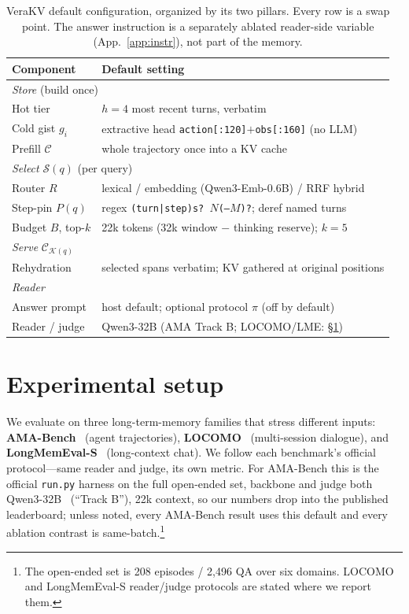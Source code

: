 \documentclass{article} %
\newcommand{\kvm}{VeraKV}
\begin{document}
\begin{table}[t]
\centering
\caption{\kvm{} default configuration, organized by its two pillars. Every row is
a swap point. The answer instruction is a separately ablated reader-side variable
(App.~\ref{app:instr}), not part of the memory.}
\label{tab:config}
\footnotesize
\begin{tabular}{ll}
\toprule
Component & Default setting \\
\midrule
\multicolumn{2}{l}{\emph{Store} (build once)} \\
\quad Hot tier & $h{=}4$ most recent turns, verbatim \\
\quad Cold gist $g_i$ & extractive head \texttt{action[:120]}$+$\texttt{obs[:160]} (no LLM) \\
\quad Prefill $\mathcal{C}$ & whole trajectory once into a KV cache \\
\midrule
\multicolumn{2}{l}{\emph{Select} $\mathcal{S}(q)$ (per query)} \\
\quad Router $R$ & lexical / embedding (Qwen3-Emb-0.6B) / RRF hybrid \\
\quad Step-pin $P(q)$ & regex \texttt{(turn|step)s?\,$N$(--$M$)?}; deref named turns \\
\quad Budget $B$, top-$k$ & 22k tokens (32k window $-$ thinking reserve); $k{=}5$ \\
\midrule
\multicolumn{2}{l}{\emph{Serve} $\mathcal{C}_{\mathcal{K}(q)}$} \\
\quad Rehydration & selected spans verbatim; KV gathered at original positions \\
\midrule
\multicolumn{2}{l}{\emph{Reader}} \\
\quad Answer prompt & host default; optional protocol $\pi$ (off by default) \\
\quad Reader / judge & Qwen3-32B (AMA Track B; LOCOMO/LME: \S\ref{sec:setup}) \\
\bottomrule
\end{tabular}
\end{table}

\section{Experimental setup}
\label{sec:setup}

We evaluate on three long-term-memory families that stress different inputs:
\textbf{AMA-Bench}~\citep{amabench} (agent trajectories), \textbf{LOCOMO}~\citep{locomo}
(multi-session dialogue), and \textbf{LongMemEval-S}~\citep{longmemeval} (long-context
chat). We follow each benchmark's official protocol---same reader and judge, its own
metric. For AMA-Bench this is the official \texttt{run.py} harness on the full
open-ended set, backbone and judge both Qwen3-32B~\citep{qwen3} (``Track B''), 22k
context, so our numbers drop into the published leaderboard; unless noted, every
AMA-Bench result uses this default and every ablation contrast is
same-batch.\footnote{The open-ended set is 208 episodes / 2{,}496 QA over six domains.
LOCOMO and LongMemEval-S reader/judge protocols are stated where we report them.}
\end{document}
